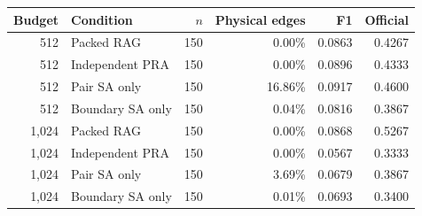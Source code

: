 \begin{tabular}{rlrrrr}
\toprule
Budget & Condition & $n$ & Physical edges & F1 & Official \\
\midrule
512 & Packed RAG & 150 & 0.00\% & 0.0863 & 0.4267 \\
512 & Independent PRA & 150 & 0.00\% & 0.0896 & 0.4333 \\
512 & Pair SA only & 150 & 16.86\% & 0.0917 & 0.4600 \\
512 & Boundary SA only & 150 & 0.04\% & 0.0816 & 0.3867 \\
1,024 & Packed RAG & 150 & 0.00\% & 0.0868 & 0.5267 \\
1,024 & Independent PRA & 150 & 0.00\% & 0.0567 & 0.3333 \\
1,024 & Pair SA only & 150 & 3.69\% & 0.0679 & 0.3867 \\
1,024 & Boundary SA only & 150 & 0.01\% & 0.0693 & 0.3400 \\
\bottomrule
\end{tabular}
